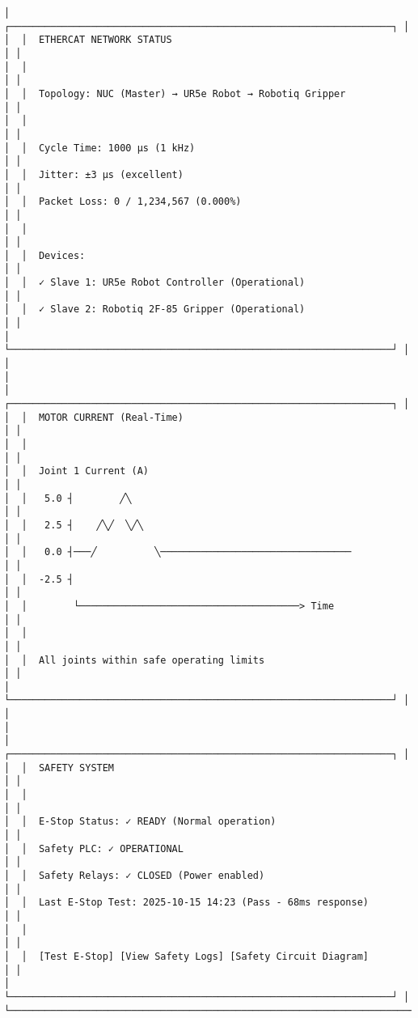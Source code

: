 \documentclass[
]{article}
\begin{document}
\begin{verbatim}
│  ┌──────────────────────────────────────────────────────────────────┐ │
│  │  ETHERCAT NETWORK STATUS                                         │ │
│  │                                                                   │ │
│  │  Topology: NUC (Master) → UR5e Robot → Robotiq Gripper           │ │
│  │                                                                   │ │
│  │  Cycle Time: 1000 µs (1 kHz)                                     │ │
│  │  Jitter: ±3 µs (excellent)                                       │ │
│  │  Packet Loss: 0 / 1,234,567 (0.000%)                             │ │
│  │                                                                   │ │
│  │  Devices:                                                        │ │
│  │  ✓ Slave 1: UR5e Robot Controller (Operational)                  │ │
│  │  ✓ Slave 2: Robotiq 2F-85 Gripper (Operational)                  │ │
│  └──────────────────────────────────────────────────────────────────┘ │
│                                                                        │
│  ┌──────────────────────────────────────────────────────────────────┐ │
│  │  MOTOR CURRENT (Real-Time)                                       │ │
│  │                                                                   │ │
│  │  Joint 1 Current (A)                                             │ │
│  │   5.0 ┤        ╱╲                                                │ │
│  │   2.5 ┤    ╱╲╱  ╲╱╲                                              │ │
│  │   0.0 ┤───╱          ╲─────────────────────────────────          │ │
│  │  -2.5 ┤                                                           │ │
│  │        └──────────────────────────────────────> Time             │ │
│  │                                                                   │ │
│  │  All joints within safe operating limits                         │ │
│  └──────────────────────────────────────────────────────────────────┘ │
│                                                                        │
│  ┌──────────────────────────────────────────────────────────────────┐ │
│  │  SAFETY SYSTEM                                                   │ │
│  │                                                                   │ │
│  │  E-Stop Status: ✓ READY (Normal operation)                       │ │
│  │  Safety PLC: ✓ OPERATIONAL                                       │ │
│  │  Safety Relays: ✓ CLOSED (Power enabled)                         │ │
│  │  Last E-Stop Test: 2025-10-15 14:23 (Pass - 68ms response)       │ │
│  │                                                                   │ │
│  │  [Test E-Stop] [View Safety Logs] [Safety Circuit Diagram]       │ │
│  └──────────────────────────────────────────────────────────────────┘ │
└────────────────────────────────────────────────────────────────────────┘
\end{verbatim}
\end{document}
